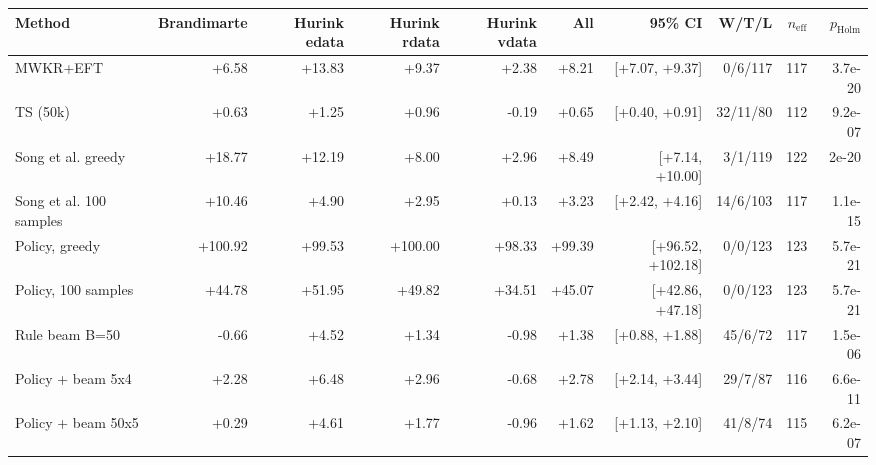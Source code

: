 \begin{tabular}{lrrrrrrrrr}
\toprule
Method & Brandimarte & Hurink edata & Hurink rdata & Hurink vdata & All & 95\% CI & W/T/L & $n_{\mathrm{eff}}$ & $p_{\mathrm{Holm}}$ \\
\midrule
MWKR+EFT & +6.58 & +13.83 & +9.37 & +2.38 & +8.21 & [+7.07, +9.37] & 0/6/117 & 117 & 3.7e-20 \\
TS (50k) & +0.63 & +1.25 & +0.96 & -0.19 & +0.65 & [+0.40, +0.91] & 32/11/80 & 112 & 9.2e-07 \\
Song et al. greedy & +18.77 & +12.19 & +8.00 & +2.96 & +8.49 & [+7.14, +10.00] & 3/1/119 & 122 & 2e-20 \\
Song et al. 100 samples & +10.46 & +4.90 & +2.95 & +0.13 & +3.23 & [+2.42, +4.16] & 14/6/103 & 117 & 1.1e-15 \\
Policy, greedy & +100.92 & +99.53 & +100.00 & +98.33 & +99.39 & [+96.52, +102.18] & 0/0/123 & 123 & 5.7e-21 \\
Policy, 100 samples & +44.78 & +51.95 & +49.82 & +34.51 & +45.07 & [+42.86, +47.18] & 0/0/123 & 123 & 5.7e-21 \\
Rule beam B=50 & -0.66 & +4.52 & +1.34 & -0.98 & +1.38 & [+0.88, +1.88] & 45/6/72 & 117 & 1.5e-06 \\
Policy + beam 5x4 & +2.28 & +6.48 & +2.96 & -0.68 & +2.78 & [+2.14, +3.44] & 29/7/87 & 116 & 6.6e-11 \\
Policy + beam 50x5 & +0.29 & +4.61 & +1.77 & -0.96 & +1.62 & [+1.13, +2.10] & 41/8/74 & 115 & 6.2e-07 \\
\bottomrule
\end{tabular}
